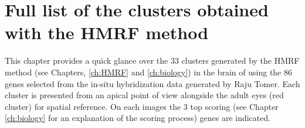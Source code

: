 \chapter{Full list of the clusters obtained with the HMRF method}
This chapter provides a quick glance over the 33 clusters generated by the HMRF method (see Chapters, \ref{ch:HMRF} and \ref{ch:biology}) in the brain of \platy{} using the $86$ genes selected from the in-situ hybridization data generated by Raju Tomer. Each cluster is presented from an apical point of view alongside the adult eyes (red cluster) for spatial reference. On each images the 3 top scoring (see Chapter \ref{ch:biology} for an explanation of the scoring process) genes are indicated.\\

\renewcommand{\thesubfigure}{\roman{subfigure}}


